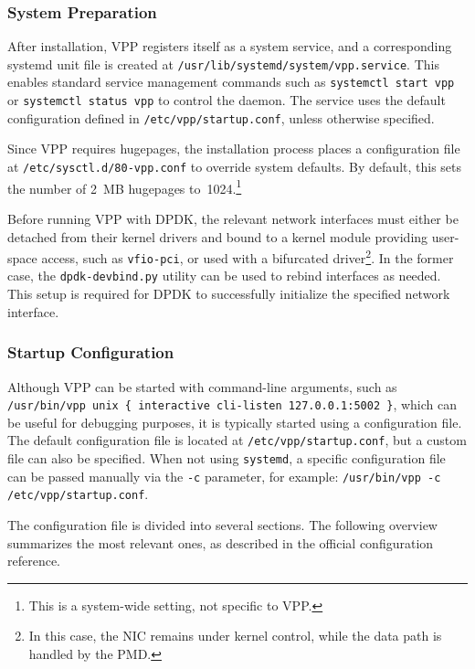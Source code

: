 \subsubsection{System Preparation}
After installation, VPP registers itself as a system service, and a corresponding systemd unit file is created at \texttt{/usr/lib/systemd/system/vpp.service}. 
This enables standard service management commands such as \texttt{systemctl start vpp} or \texttt{systemctl status vpp} to control the daemon. 
The service uses the default configuration defined in \texttt{/etc/vpp/startup.conf}, unless otherwise specified.

Since VPP requires hugepages, the installation process places a configuration file at \texttt{/etc/sysctl.d/80-vpp.conf} to override system defaults. 
By default, this sets the number of 2~MB hugepages to~1024.\footnote{This is a system-wide setting, not specific to VPP.}~\cite{fdio-running}

Before running VPP with DPDK, the relevant network interfaces must either be detached from their kernel drivers and bound to a kernel module providing user-space access, such as \texttt{vfio-pci},
or used with a bifurcated driver\footnote{In this case, the NIC remains under kernel control, while the data path is handled by the PMD.}.
In the former case, the \texttt{dpdk-devbind.py} utility can be used to rebind interfaces as needed.
This setup is required for DPDK to successfully initialize the specified network interface.~\cite{dpdk-linux-drivers}

\subsubsection{Startup Configuration}
Although VPP can be started with command-line arguments, such as \verb|/usr/bin/vpp unix { interactive cli-listen 127.0.0.1:5002 }|, which can be useful for debugging purposes, 
it is typically started using a configuration file. 
The default configuration file is located at \texttt{/etc/vpp/startup.conf}, but a custom file can also be specified.
When not using \texttt{systemd}, a specific configuration file can be passed manually via the \texttt{-c} parameter, 
for example: \verb|/usr/bin/vpp -c /etc/vpp/startup.conf|.~\cite{fdio-config-getting-started} 

The configuration file is divided into several sections. The following overview summarizes the most relevant ones, as described in the official configuration reference.~\cite{fdio-config-reference}

